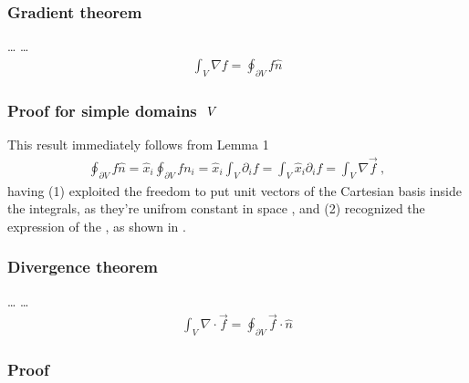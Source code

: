 \documentclass[letterpaper,10pt,english]{jupyterBook}
\begin{document}
\subsubsection{Gradient theorem}
\label{\detokenize{ch/tensor-algebra-calculus/calculus-euclidean:gradient-theorem}}\label{\detokenize{ch/tensor-algebra-calculus/calculus-euclidean:tensor-calculus-integrals-theorems-gradient}}
\sphinxAtStartPar
… …
\begin{equation*}
\begin{split}\int_{V} \nabla f = \oint_{\partial V} f \hat{n}\end{split}
\end{equation*}\subsubsection*{Proof for simple domains \protect\(\ V\protect\)}

\sphinxAtStartPar
This result immediately follows from Lemma 1 {\hyperref[\detokenize{ch/tensor-algebra-calculus/calculus-euclidean:lemma-1}]{}}
\begin{equation*}
\begin{split}\oint_{\partial V} f \hat{n} = \hat{x}_i  \oint_{\partial V} f n_i = \hat{x}_i \int_{V} \partial_i f =  \int_{V} \hat{x}_i \partial_i f = \int_{V} \nabla \vec{f} \ , \end{split}
\end{equation*}
\sphinxAtStartPar
having (1) exploited the freedom to put unit vectors of the Cartesian basis inside the integrals, as they’re unifrom \sphinxhyphen{} constant in space \sphinxhyphen{}, and (2) recognized the expression of the {\hyperref[\detokenize{ch/tensor-algebra-calculus/calculus-euclidean-cartesian:tensor-calculus-cartesian-differential-operators-gradient}]{}}, as shown in {\hyperref[\detokenize{ch/tensor-algebra-calculus/calculus-euclidean-cartesian:cartesian:gradient:scalar}]{}}.




\subsubsection{Divergence theorem}
\label{\detokenize{ch/tensor-algebra-calculus/calculus-euclidean:divergence-theorem}}\label{\detokenize{ch/tensor-algebra-calculus/calculus-euclidean:tensor-calculus-integrals-theorems-divergence}}
\sphinxAtStartPar
… …
\begin{equation*}
\begin{split}\int_{V} \nabla \cdot \vec{f} = \oint_{\partial V} \vec{f} \cdot \hat{n}\end{split}
\end{equation*}\subsubsection*{Proof}
\end{document}
